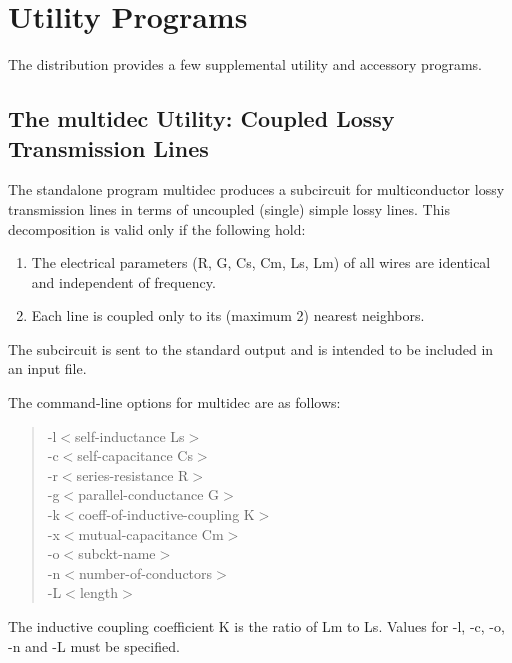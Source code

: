 
\chapter{Utility Programs}


The {\WRspice} distribution provides a few supplemental utility
and accessory programs.


\section{The {\vt multidec} Utility: Coupled Lossy Transmission Lines}


The standalone program {\vt multidec} produces a subcircuit for
multiconductor lossy transmission lines in terms of uncoupled (single)
simple lossy lines.  This decomposition is valid only if the following
hold:

\begin{enumerate}
\item{The electrical parameters (R, G, Cs, Cm, Ls, Lm) of all wires are
 identical and independent of frequency.}
\item{Each line is coupled only to its (maximum 2) nearest neighbors.}
\end{enumerate}

The subcircuit is sent to the standard output and is intended to be
included in an input file.

The command-line options for {\vt multidec} are as follows:
\begin{quote}
{\vt -l}$<$self-inductance Ls$>$\\
{\vt -c}$<$self-capacitance Cs$>$\\
{\vt -r}$<$series-resistance R$>$\\
{\vt -g}$<$parallel-conductance G$>$\\
{\vt -k}$<$coeff-of-inductive-coupling K$>$\\
{\vt -x}$<$mutual-capacitance Cm$>$\\
{\vt -o}$<$subckt-name$>$\\
{\vt -n}$<$number-of-conductors$>$\\
{\vt -L}$<$length$>$
\end{quote}

The inductive coupling coefficient K is the ratio of Lm
to Ls. Values for -l, -c, -o, -n and -L must be specified.

